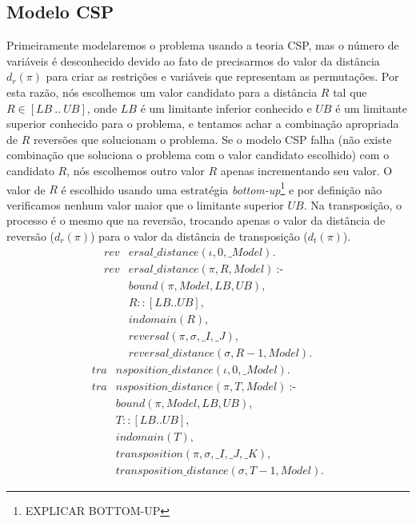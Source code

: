 \subsection{Modelo CSP}
\label{subsec:modelcsp}
Primeiramente modelaremos o problema usando a teoria CSP, mas o número
de variáveis é desconhecido devido ao fato de precisarmos do valor da
distância $d_{r}(\pi)$ para criar as restrições e variáveis que
representam as permutações. Por esta razão, nós escolhemos um valor
candidato para a distância $R$ tal que $R \in [LB~..~UB]$, onde $LB$ é
um limitante inferior conhecido e $UB$ é um limitante superior
conhecido para o problema, e tentamos achar a combinação apropriada de
$R$ reversões que solucionam o problema. Se o modelo CSP falha (não
existe combinação que soluciona o problema com o valor candidato
escolhido) com o candidato $R$, nós escolhemos outro valor $R$ apenas
incrementando seu valor. O valor de $R$ é escolhido usando uma
estratégia \textit{bottom-up}\footnote{EXPLICAR BOTTOM-UP} e por
definição não verificamos nenhum valor maior que o limitante superior
$UB$. Na transposição, o processo é o mesmo que na reversão, trocando
apenas o valor da distância de reversão ($d_{r}(\pi)$) para o valor da
distância de transposição ($d_{t}(\pi)$).
\begin{align}
  \label{revdistance}
  \textit{rev}&\textit{ersal\_distance}(\iota, 0, \_Model). \nonumber\\
  \textit{rev}&\textit{ersal\_distance}(\pi, R, Model)~\text{:-} \nonumber\\
  &\textit{bound}(\pi, Model, LB, UB), \nonumber\\
  &R :: [LB .. UB], \\
  &\textit{indomain}(R), \nonumber \\
  &\textit{reversal}(\pi, \sigma, \_I, \_J), \nonumber \\
  &\textit{reversal\_distance}(\sigma, R-1, Model). \nonumber
\end{align}
\begin{align}
  \label{tradistance}
  \textit{tra}&\textit{nsposition\_distance}(\iota, 0, \_Model). \nonumber\\
  \textit{tra}&\textit{nsposition\_distance}(\pi, T, Model)~\text{:-} \nonumber\\
  &\textit{bound}(\pi, Model, LB, UB), \nonumber\\
  &T :: [LB .. UB], \\
  &\textit{indomain}(T), \nonumber \\
  &\textit{transposition}(\pi, \sigma, \_I, \_J, \_K), \nonumber \\
  &\textit{transposition\_distance}(\sigma, T-1, Model). \nonumber
\end{align}

